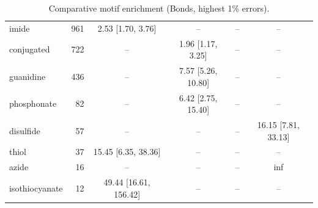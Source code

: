 \begin{table}[h!]
\begin{tabular}{l r c c c c}
    imide & 961 & 2.53\,\,[1.70, 3.76] & -- & -- & -- \\
    conjugated & 722 & -- & 1.96\,\,[1.17, 3.25] & -- & -- \\
    guanidine & 436 & -- & 7.57\,\,[5.26, 10.80] & -- & -- \\
    phosphonate & 82 & -- & 6.42\,\,[2.75, 15.40] & -- & -- \\
    disulfide & 57 & -- & -- & -- & 16.15\,\,[7.81, 33.13] \\
    thiol & 37 & 15.45\,\,[6.35, 38.36] & -- & -- & -- \\
    azide & 16 & -- & -- & -- & inf \\
    isothiocyanate & 12 & 49.44\,\,[16.61, 156.42] & -- & -- & -- \\
    \hline
  \end{tabular}
  \caption{Comparative motif enrichment (Bonds, highest 1\% errors).}
  \label{tab:compare_bonds_worst}
\end{table}